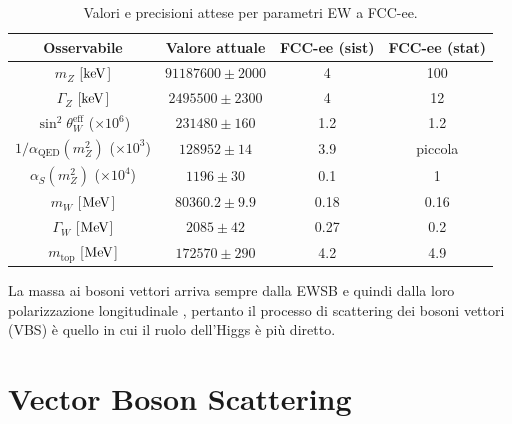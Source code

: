 \begin{table}
    \centering
    \begin{tabular}{cccc}
        Osservabile  & Valore attuale & FCC-ee (sist) & FCC-ee (stat) \\
        \hline 
        $m_Z$ [$\mathrm{keV}$]                                  & $91 187 600 \pm 2000$ & 4    & 100     \\
        $\Gamma_Z$ [$\mathrm{keV}$]                             &  $2 495 500 \pm 2300$ & 4    & 12      \\
        $\sin^2\theta_W^{\mathrm{eff}}$ ($\times10^6$)  &    $231 480 \pm  160$ & 1.2  & 1.2     \\
        $1/\alpha_{\mathrm{QED}}(m_Z^2)$ ($\times10^3$) &    $128 952 \pm   14$ & 3.9  & piccola \\
        $\alpha_S(m_Z^2)$ ($\times10^4$)                &       $1196 \pm   30$ & 0.1  & 1       \\
        $m_W$ [$\mathrm{MeV}$]                                  &   $80 360.2 \pm  9.9$ & 0.18 & 0.16    \\
        $\Gamma_W$ [$\mathrm{MeV}$]                             &       $2085 \pm   42$ & 0.27 & 0.2     \\
        $m_{\mathrm{top}}$ [$\mathrm{MeV}$]                     &    $172 570 \pm  290$ & 4.2  & 4.9     \\
    \end{tabular}
    \caption{Valori e precisioni attese per parametri EW a FCC-ee. }
    \label{tab:parametriSM}
\end{table}

La massa ai bosoni vettori arriva sempre dalla EWSB e quindi dalla loro polarizzazione longitudinale , pertanto il processo di scattering dei bosoni vettori (VBS) è quello in cui il ruolo dell'Higgs è più diretto.

\section{Vector Boson Scattering}


